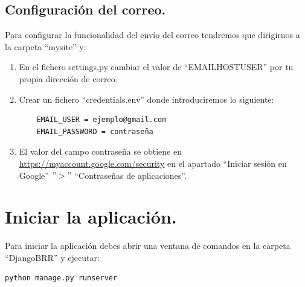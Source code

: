 \documentclass[a4paper, 12pt]{book}
\begin{document}
\subsection{Configuración del correo.}
Para configurar la funcionalidad del envío del correo tendremos que dirigirnos a la carpeta ``mysite'' y:
\begin{enumerate}
	\item En el fichero settings.py cambiar el valor de ``EMAIL\textunderscore HOST\textunderscore USER'' por tu propia dirección de correo.
	\item Crear un fichero ``credentials.env'' donde introduciremos lo siguiente:
	\begin{verbatim}
	EMAIL_USER = ejemplo@gmail.com
	EMAIL_PASSWORD = contraseña
	\end{verbatim}
	\item El valor del campo contraseña se obtiene en \url{https://myaccount.google.com/security} en el apartado ``Iniciar sesión en Google'' $">"$ ``Contraseñas de aplicaciones''.
\end{enumerate}
\section{Iniciar la aplicación.}
Para iniciar la aplicación debes abrir una ventana de comandos en la carpeta ``Django\textunderscore BRR'' y ejecutar:
\begin{verbatim}
python manage.py runserver
\end{verbatim}
\end{document}
